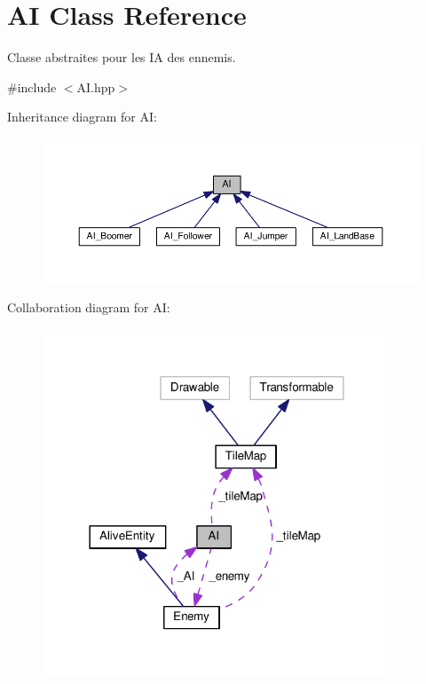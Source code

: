 \hypertarget{class_a_i}{\section{A\+I Class Reference}
\label{class_a_i}
}


Classe abstraites pour les I\+A des ennemis.  




{\ttfamily \#include $<$A\+I.\+hpp$>$}



Inheritance diagram for A\+I\+:
\nopagebreak
\begin{figure}[H]
\begin{center}
\leavevmode
\includegraphics[width=350pt]{class_a_i__inherit__graph}
\end{center}
\end{figure}


Collaboration diagram for A\+I\+:
\nopagebreak
\begin{figure}[H]
\begin{center}
\leavevmode
\includegraphics[width=294pt]{class_a_i__coll__graph}
\end{center}
\end{figure}
